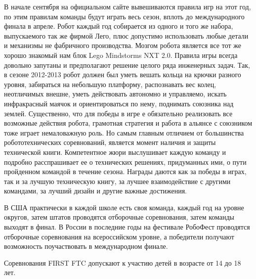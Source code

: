 В начале сентября на официальном сайте вывешиваются правила игр на этот год, по этим правилам команды будут играть весь сезон, вплоть до международного финала в апреле. Робот каждый год собирается из одного и того же набора, выпускаемого так же фирмой Лего, плюс допустимо использовать любые детали и механизмы не фабричного производства. Мозгом робота является все тот же хорошо знакомый нам блок Lego Mindstorms NXT 2.0. Правила игры всегда довольно запутаны и предполагают решение целого ряда инженерных задач. Так, в сезоне 2012-2013 робот должен был уметь вешать кольца на крючки разного уровня, забираться на небольшую платформу, распознавать вес колец, неотличимых внешне, уметь действовать автономно и управляемо, искать инфракрасный маячок и ориентироваться по нему, поднимать союзника над землей. Существенно, что для победы в игре е обязательно реализовать все возможные действия робота, грамотная стратегия и работа в альянсе с союзником тоже играет немаловажную роль. Но самым главным отличием от большинства робототехнических соревнований, является момент наличия и защиты технической книги. Компетентное жюри выслушивает каждую команду и подробно расспрашивает ее о технических решениях, придуманных ими, о пути пройденном командой в течение сезона. Награды даются как за победы в играх, так и за лучшую техническую книгу, за лучшее взаимодействие с другими командами, за лучший дизайн и другие важные достижения.

В США практически в каждой школе есть своя команда, каждый год на уровне округов, затем штатов проводятся отборочные соревнования, затем команды выходят в финал. В России в последние годы на фестивале РобоФест проводятся отборочные соревнования на всероссийском уровне, а победители получают возможность поучаствовать в международном финале.

Соревнования FIRST FTC допускают к участию детей в возрасте от 14 до 18 лет.\\\\

{\hypertarget{lesson30x5}{}}\\\\

